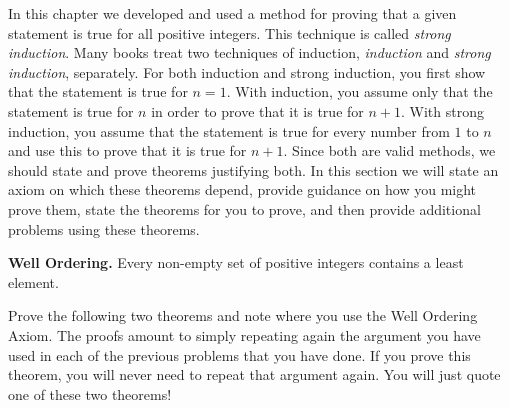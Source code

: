 In this chapter we developed and used a method for proving that a given statement is true for all positive integers.   This technique is called \emph{strong induction}.  Many books treat two techniques of induction, \emph{induction} and \emph{strong induction}, separately.  For both induction and strong induction, you first show that the statement is true for $n=1.$  With induction, you assume only that the statement is true for $n$ in order to prove that it is true for $n+1$.  With strong induction, you assume that the statement is true for every number from $1$ to $n$ and use this to prove that it is true for $n+1$.  Since both are valid methods, we should state and prove theorems justifying both.  In this section we will state an axiom on which these theorems depend, provide guidance on how you might prove them, state the theorems for you to prove, and then provide additional problems using these theorems.
\begin{annotation}
\end{annotation}


\begin{axm}
\textbf{Well Ordering.}  Every non-empty set of positive integers contains a least element.
\end{axm}

\begin{prb}
Prove the following two theorems and note where you use the Well Ordering Axiom.  The proofs amount to simply repeating again the argument you have used in each of the previous problems that you have done.  If you prove this theorem, you will never need to repeat that argument again.  You will just quote one of these two theorems!
\end{prb}

